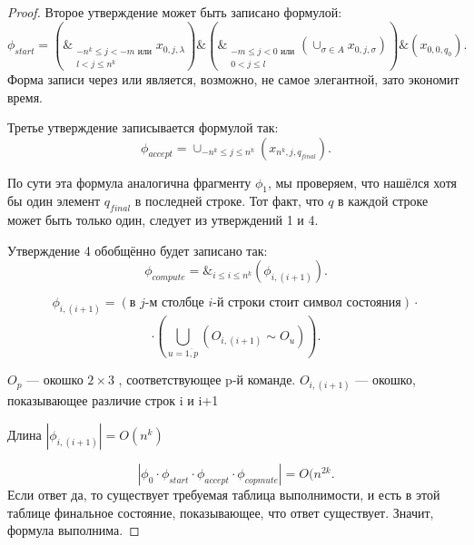 \begin{proof}
Второе утверждение может быть записано формулой:
\[
	\phi_{start} = \left( \&_{\substack{-n^k\le j < -m \text{ или} \\ l<j\le n^k}} x_{0,j,\lambda} \right) \& 
	\left( \&_{\substack{-m\le  j < 0 \text{ или}\\ 0<j\le l}}
	\left(\cup_{\sigma \in A} x_{0,j,\sigma}\right) \right) \& 
	\left( x_{0,0,q_0} \right) 
.\] 
Форма записи через или является, возможно, не самое элегантной, зато экономит
время.

Третье утверждение записывается формулой так:
\[
	\phi_{accept} = \cup_{-n^k\le j\le n^k} (x_{n^k, j, q_{final}})
.\] 

По сути эта формула аналогична фрагменту $\phi_1$, мы проверяем, что нашёлся
хотя бы один элемент $q_{final}$ в последней строке. Тот факт, что $q$ в каждой
строке может быть только один, следует из утверждений 1 и 4.

Утверждение 4 обобщённо будет записано так:
 \[
	 \phi_{compute} =  \&_{i\le i\le n^k} (\phi_{i, (i+1)})
.\]

\[
	\phi_{i, (i+1)} = (\text{в $j$-м столбце $i$-й строки стоит символ
			состояния})\cdot 
		\]
		\[\cdot (\bigcup\limits_{u=\overline{1, p}}\left( O_{i,
	(i+1)} \sim O_u \right) )
.\]

$O_p$ --- окошко  $2\times 3$ , соответствующее p-й команде. $O_{i, (i+1)}$ ---
окошко, показывающее различие строк i и i+1

Длина  $|\phi_{i, (i+1)}| = O(n^k)$

 \[
	 |\phi_0 \cdot \phi_{start}\cdot \phi_{accept} \cdot  \phi_{copmute}| =
 O(n^{2k}
.\] 
Если ответ да, то существует требуемая таблица выполнимости, и есть в этой
таблице финальное состояние, показывающее, что ответ существует. Значит, формула
выполнима. 
\end{proof}


